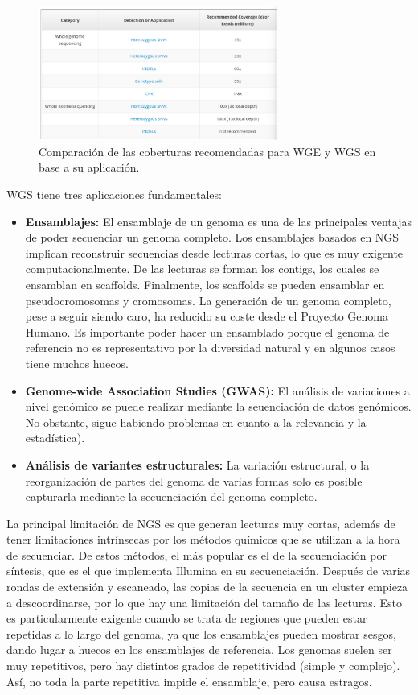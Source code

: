 \begin{itemize}
\begin{figure}[htbp]
\centering
\includegraphics[width = 0.7\textwidth]{figs/wge-wgs.png}
\caption{Comparación de las coberturas recomendadas para WGE y WGS en base a su aplicación.}
\end{figure}

WGS tiene tres aplicaciones fundamentales:
\begin{itemize}
\item \textbf{Ensamblajes:} El ensamblaje de un genoma es una de las principales ventajas de poder secuenciar un genoma completo. Los ensamblajes basados en NGS implican reconstruir secuencias desde lecturas cortas, lo que es muy exigente computacionalmente. De las lecturas se forman los contigs, los cuales se ensamblan en scaffolds. Finalmente, los scaffolds se pueden ensamblar en pseudocromosomas y cromosomas. La generación de un genoma completo, pese a seguir siendo caro, ha reducido su coste desde el Proyecto Genoma Humano. Es importante poder hacer un ensamblado porque el genoma de referencia no es representativo por la diversidad natural y en algunos casos tiene muchos huecos.
\item \textbf{Genome-wide Association Studies (GWAS):} El análisis de variaciones a nivel genómico se puede realizar mediante la seuenciación de datos genómicos. No obstante, sigue habiendo problemas en cuanto a la relevancia y la estadística).
\item \textbf{Análisis de variantes estructurales:} La variación estructural, o la reorganización de partes del genoma de varias formas solo es posible capturarla mediante la secuenciación del genoma completo.
\end{itemize}

La principal limitación de NGS es que generan lecturas muy cortas, además de tener limitaciones intrínsecas por los métodos químicos que se utilizan a la hora de secuenciar. De estos métodos, el más popular es el de la secuenciación por síntesis, que es el que implementa Illumina en su secuenciación. Después de varias rondas de extensión y escaneado, las copias de la secuencia en un cluster empieza a descoordinarse, por lo que hay una limitación del tamaño de las lecturas. Esto es particularmente exigente cuando se trata de regiones que pueden estar repetidas a lo largo del genoma, ya que los ensamblajes pueden mostrar sesgos, dando lugar a huecos en los ensamblajes de referencia. Los genomas suelen ser muy repetitivos, pero hay distintos grados de repetitividad (simple y complejo). Así, no toda la parte repetitiva impide el ensamblaje, pero causa estragos.


\end{itemize}
